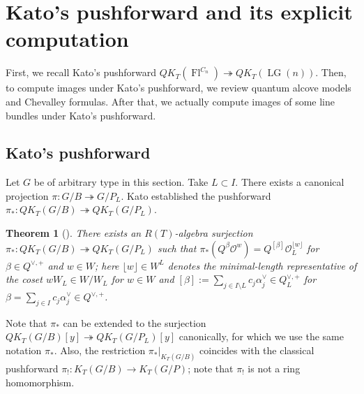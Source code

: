 \documentclass[a4paper, 11pt, reqno]{amsart}
\numberwithin{equation}{section}
\newcommand{\CO}{\mathcal{O}}
\newcommand{\LG}{\operatorname{LG}}
\newcommand{\FlC}[1]{\operatorname{Fl}^{C_{#1}}}
\newcommand{\mcr}[1]{\lfloor #1 \rfloor}
\theoremstyle{plain}
\newtheorem{thm}{Theorem}[section]
\theoremstyle{definition}
\theoremstyle{remark}
\begin{document}
\section{Kato's pushforward and its explicit computation} \label{sec:Kato_push}
First, we recall Kato's pushforward $QK_{T}(\FlC{n}) \twoheadrightarrow QK_{T}(\LG(n))$. 
Then, to compute images under Kato's pushforward, we review quantum alcove models and Chevalley formulas. 
After that, we actually compute images of some line bundles under Kato's pushforward. 

\subsection{Kato's pushforward}
Let $G$ be of arbitrary type in this section. Take $L \subset I$. 
There exists a canonical projection $\pi: G/B \twoheadrightarrow G/P_{L}$. Kato established the pushforward $\pi_{\ast}: QK_{T}(G/B) \twoheadrightarrow QK_{T}(G/P_{L})$. 
\begin{thm}[{\cite[Theorem~2.19]{Kato}}]
There exists an $R(T)$-algebra surjection $\pi_{\ast}: QK_{T}(G/B) \twoheadrightarrow QK_{T}(G/P_{L})$ such that 
$\pi_{\ast}(Q^{\beta} \CO^{w}) = Q^{[\beta]} \CO_{L}^{\mcr{w}}$ for $\beta \in Q^{\vee, +}$ and $w \in W$; here $\mcr{w} \in W^{L}$ denotes the minimal-length representative of the coset $wW_{L} \in W/W_{L}$ for $w \in W$ and $[\beta] := \sum_{j \in I \setminus L} c_{j}\alpha_{j}^{\vee} \in Q_{L}^{\vee, +}$ for $\beta = \sum_{j \in I} c_{j}\alpha_{j}^{\vee} \in Q^{\vee, +}$. 
\end{thm}

Note that $\pi_{\ast}$ can be extended to the surjection $QK_{T}(G/B)[y] \twoheadrightarrow QK_{T}(G/P_{L})[y]$ canonically, for which we use the same notation $\pi_{\ast}$. 
Also, the restriction $\pi_{\ast}|_{K_{T}(G/B)}$ coincides with the classical pushforward $\pi_{!}: K_{T}(G/B) \rightarrow K_{T}(G/P)$; note that $\pi_{!}$ is not a ring homomorphism. 
\end{document}
